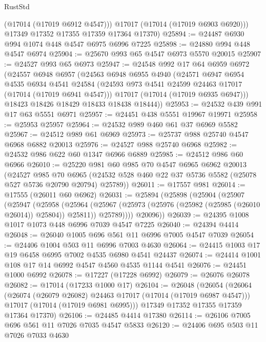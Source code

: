 \begin{lexlean}{RustStd}
\begin{coremodule}
          (@17014 (@17019 @6912 @4547)))
        @17017
        (@17014 (@17019 @6903 @6920)))
      @17349
      @17352
      @17355
      @17359
      @17364
      @17370)
@25894 := @24487 @6930 @994 @1074 @448 @4547 @6975 @6996 @7225
@25898 := @24880 @994 @448 @4547 @6974
@25904 := @25670 @993 @65 @4547 @6973 @5570 @20015
@25907 := @24527 @993 @65 @6973
@25947 := @24548
    @992
    @17
    @64
    @6959
    @6972
    (@24557
      @6948
      @6957
      (@24563
        @6948
        @6955
        @4940
        (@24571
          @6947
          @6954
          @4535
          @6934
          @4541
          @24584
          (@24593 @973 @4541 @24599 @24463 @17017 (@17014 (@17019 @6941 @4547)))
          @17017
          (@17014 (@17019 @6935 @6947)))
        @18423
        @18426
        @18429
        @18433
        @18438
        @18444))
@25953 := @24532 @439 @991 @17 @63 @5551 @6971
@25957 := @24451 @438 @5551 @19967 @19971
@25958 := @25953 @25957
@25964 := @24532 @989 @460 @61 @37 @6969 @5582
@25967 := @24512 @989 @61 @6969
@25973 := @25737 @988 @25740 @4547 @6968 @6882 @20013
@25976 := @24527 @988 @25740 @6968
@25982 := @24532 @986 @622 @60 @1347 @6966 @6889
@25985 := @24512 @986 @60 @6966
@26010 := @25220
    @981
    @60
    @985
    @70
    @4547
    @6965
    @6962
    @20013
    (@24527
      @985
      @70
      @6965
      (@24532 @528 @460 @22 @37 @5736 @5582 (@25078 @527 @5736 @20790 @20794) @25789))
@26011 := @17557 @981
@26014 := @17555 (@26011 @60 @6962)
@26031 := @25894
    (@25898
      (@25904
        (@25907
          (@25947
            (@25958
              (@25964
                (@25967 (@25973 (@25976 (@25982 (@25985 (@26010 @26014)) @25804)) @25811))
                @25789))))
        @20096))
@26039 := @24395 @1008 @1017 @1073 @448 @6996 @7039 @4547 @7225
@26040 := @24394 @4414
@26048 := @26040 @1005 @696 @561 @11 @6996 @7005 @4547 @7039
@26054 := @24406 @1004 @503 @11 @6996 @7003 @4630
@26064 := @24415 @1003 @17 @19 @6458 @6995 @7002 @4535 @6980 @4541 @24437
@26074 := @24414 @1001 @108 @17 @14 @6992 @4547 @4560 @4535 @1144 @4541
@26076 := @24451 @1000 @6992
@26078 := @17227 (@17228 @6992)
@26079 := @26076 @26078
@26082 := @17014 (@17233 @1000 @17)
@26104 := @26048
    (@26054
      (@26064
        (@26074 (@26079 @26082) @24463 @17017 (@17014 (@17019 @6987 @4547)))
        @17017
        (@17014 (@17019 @6981 @6995)))
      @17349
      @17352
      @17355
      @17359
      @17364
      @17370)
@26106 := @24485 @4414 @17380
@26114 := @26106 @7005 @696 @561 @11 @7026 @7035 @4547 @5833
@26120 := @24406 @695 @503 @11 @7026 @7033 @4630

\end{coremodule}
\end{lexlean}
